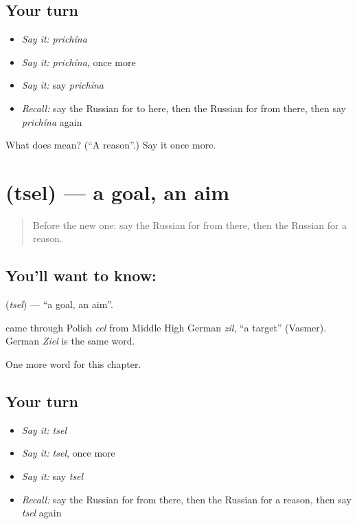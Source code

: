 \subsection*{Your turn}
\begin{itemize}
\raggedright
  \item \emph{Say it:} \emph{prichína}
  \item \emph{Say it:} \emph{prichína}, once more
  \item \emph{Say it:} say \emph{prichína}
  \item \emph{Recall:} say the Russian for to here, then the Russian for from there, then say \emph{prichína} again
\end{itemize}

\begin{tcolorbox}[breakable,colback=teal!4,colframe=teal!35!black,title={Before you move on}]
What does  mean? (\textquotedblleft{}A reason\textquotedblright{}.) Say it once more.
\end{tcolorbox}
\section[\texorpdfstring{\ru{цель} (tsel)}{цель (tsel)}]{ (tsel) — a goal, an aim}

\label{lesson:RU-C185-tsel}



\begin{quote}
Before the new one: say the Russian for from there, then the Russian for a reason.
\end{quote}

\subsection*{You'll want to know: }
\textbf{} (\emph{tsel}) — \textquotedblleft{}a goal, an aim\textquotedblright{}.

\begin{cousinweb}
\textbf{} came through Polish \emph{cel} from Middle High German \emph{zil}, \textquotedblleft{}a target\textquotedblright{} (Vasmer). German \emph{Ziel} is the same word.
\end{cousinweb}

\begin{grammarlens}[title={What you've built}]
One more word for this chapter.
\end{grammarlens}

\subsection*{Your turn}
\begin{itemize}
\raggedright
  \item \emph{Say it:} \emph{tsel}
  \item \emph{Say it:} \emph{tsel}, once more
  \item \emph{Say it:} say \emph{tsel}
  \item \emph{Recall:} say the Russian for from there, then the Russian for a reason, then say \emph{tsel} again
\end{itemize}

